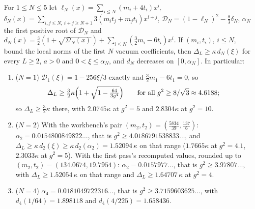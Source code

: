 \begin{corollary}\label{cor:ym-orderN}
For $1\le N\le5$ let $\ell_N(x)=\sum_{i\le N}(m_i+4t_i)x^i$, $\delta_N(x)=\sum_{i,j\le N,\ i+j\ge N+1}3(m_it_j+m_jt_i)x^{i+j}$, $\mathcal D_N=(1-\ell_N)^2-\frac83\delta_N$, $\alpha_N$ the first positive root of $\mathcal D_N$ and $d_N(x)=\frac32(1+\sqrt{\mathcal D_N(x)})+\sum_{i\le N}(\frac32m_i-6t_i)x^i$. If $(m_i,t_i)$, $i\le N$, bound the local norms of the first $N$ vacuum coefficients, then $\Delta_L\ge\kappa\,d_N(\xi)$ for every $L\ge2$, $a>0$ and $0<\xi\le\alpha_N$, and $d_N$ decreases on $[0,\alpha_N]$. In particular:
\begin{enumerate}[label=(\alph*)]
\item ($N=1$) $\mathcal D_1(\xi)=1-256\xi/3$ exactly and $\frac32m_1-6t_1=0$, so
\[
\Delta_L\ge\tfrac32\kappa\Bigl(1+\sqrt{1-\tfrac{64}{3g^4}}\Bigr)\qquad\text{for all }g^2\ge8/\sqrt3\approx4.6188;
\]
so $\Delta_L\ge\frac32\kappa$ there, with $2.0745\kappa$ at $g^2=5$ and $2.8304\kappa$ at $g^2=10$.
\item ($N=2$) With the workbench's pair $(m_2,t_2)=(\frac{5834}{39},\frac{137}6)$: $\alpha_2=0.0154800849822\ldots$, that is $g^2\ge4.0186791538833\ldots$, and $\Delta_L\ge\kappa\,d_2(\xi)\ge\kappa\,d_2(\alpha_2)=1.52094\,\kappa$ on that range ($1.7665\kappa$ at $g^2=4.1$, $2.3033\kappa$ at $g^2=5$). With the first pass's recomputed values, rounded up to $(m_2,t_2)=(134.0674,19.7954)$: $\alpha_2=0.0157977\ldots$, that is $g^2\ge3.97807\ldots$, with $\Delta_L\ge1.52054\,\kappa$ on that range and $\Delta_L\ge1.64707\,\kappa$ at $g^2=4$.
\item ($N=4$) $\alpha_4=0.0181049722316\ldots$, that is $g^2\ge3.7159603625\ldots$, with $d_4(1/64)=1.898118$ and $d_4(4/225)=1.658436$.
\end{enumerate}
\end{corollary}
